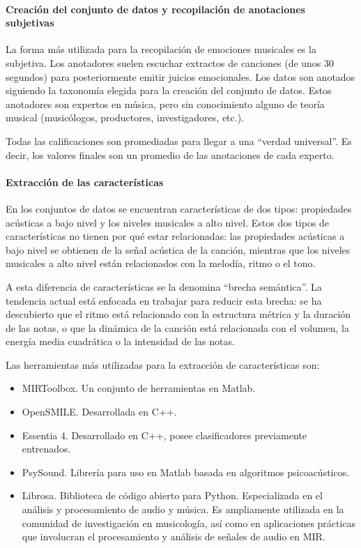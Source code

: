\documentclass[12pt,a4paper]{article}
\begin{document}
\paragraph{Creación del conjunto de datos y recopilación de anotaciones subjetivas}
La forma más utilizada para la recopilación de emociones musicales es la subjetiva. Los anotadores suelen escuchar extractos de canciones (de unos 30 segundos) para posteriormente emitir juicios emocionales. Los datos son anotados siguiendo la taxonomía elegida para la creación del conjunto de datos. Estos anotadores son expertos en música, pero sin conocimiento alguno de teoría musical (musicólogos, productores, investigadores, etc.).


Todas las calificaciones son promediadas para llegar a una ``verdad universal''. Es decir, los valores finales son un promedio de las anotaciones de cada experto.

\paragraph{Extracción de las características}
En los conjuntos de datos se encuentran características de dos tipos: propiedades acústicas a bajo nivel y los niveles musicales a alto nivel. Estos dos tipos de características no tienen por qué estar relacionadas: las propiedades acústicas a bajo nivel se obtienen de la señal acústica de la canción, mientras que los niveles musicales a alto nivel están relacionados con la melodía, ritmo o el tono.


A esta diferencia de características se la denomina ``brecha semántica''. La tendencia actual está enfocada en trabajar para reducir esta brecha: se ha descubierto que el ritmo está relacionado con la estructura métrica y la duración de las notas, o que la dinámica de la canción está relacionada con el volumen, la energía media cuadrática o la intensidad de las notas.


Las herramientas más utilizadas para la extracción de características son:
\begin{itemize}
	\item MIRToolbox. Un conjunto de herramientas en Matlab.
	\item OpenSMILE. Desarrollada en C++.
	\item Essentia 4. Desarrollado en C++, posee clasificadores previamente entrenados.
	\item PsySound. Librería para uso en Matlab basada en algoritmos psicoacústicos.
	\item Librosa. Biblioteca de código abierto para Python. Especializada en el análisis y procesamiento de audio y música. Es ampliamente utilizada en la comunidad de investigación en musicología, así como en aplicaciones prácticas que involucran el procesamiento y análisis de señales de audio en MIR.
\end{itemize}
\end{document}
